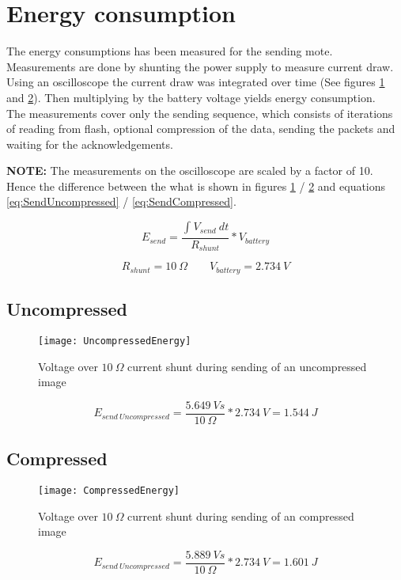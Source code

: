 \section{Energy consumption} 
\label{sec:energy_consumption}
The energy consumptions has been measured for the sending mote.
Measurements are done by shunting the power supply to measure current draw.
Using an oscilloscope the current draw was integrated over time (See figures \ref{fig:UncompressedSend} and \ref{fig:CompressedSend}).
Then multiplying by the battery voltage yields energy consumption. \\
The measurements cover only the sending sequence, which consists of iterations of reading from flash, optional compression of the data, sending the packets and waiting for the acknowledgements. 

\textbf{NOTE:} The measurements on the oscilloscope are scaled by a factor of 10.
Hence the difference between the what is shown in figures \ref{fig:UncompressedSend} / \ref{fig:CompressedSend} and equations \ref{eq:SendUncompressed} / \ref{eq:SendCompressed}.

\begin{equation}
E_{send} = 
\dfrac{\int_{}^{}V_{send}\ dt}
{R_{shunt}}
* V_{battery}
\end{equation}

\begin{equation}
R_{shunt} = 10\ \Omega
\qquad
V_{battery} = 2.734\ V
\end{equation}


\subsection{Uncompressed}

\begin{figure}[H]
\centering
\texttt{[image: UncompressedEnergy]}
\caption{Voltage over $ 10\ \Omega $ current shunt during sending of an uncompressed image}
\label{fig:UncompressedSend}
\end{figure}

\begin{equation}
E_{send\ Uncompressed} = 
\dfrac{5.649\ Vs}
{10\ \Omega}
* 2.734\ V
=
1.544\ J
\label{eq:SendUncompressed}
\end{equation}

\subsection{Compressed}

\begin{figure}[H]
\centering
\texttt{[image: CompressedEnergy]}
\caption{Voltage over $ 10\ \Omega $ current shunt during sending of an compressed image}
\label{fig:CompressedSend}
\end{figure}

\begin{equation}
E_{send\ Uncompressed} = 
\dfrac{5.889\ Vs}
{10\ \Omega}
* 2.734\ V
=
1.601\ J
\label{eq:SendCompressed}
\end{equation}



